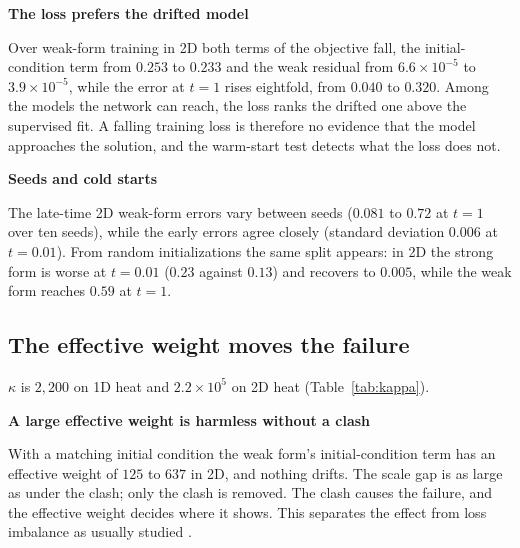 \documentclass[a4paper,fleqn]{cas-sc}
\newcommand{\runhead}[1]{\par\medskip\noindent\textbf{#1}\par\nopagebreak\noindent\ignorespaces}
\begin{document}
\runhead{The loss prefers the drifted model}
Over weak-form training in 2D both terms of the objective fall, the
initial-condition term from $0.253$ to $0.233$ and the weak residual from $6.6\times10^{-5}$ to $3.9\times10^{-5}$, while
the error at $t=1$ rises eightfold, from $0.040$ to $0.320$. Among the models the network can reach, the loss ranks the
drifted one above the supervised fit. A falling training loss is therefore no evidence that the model approaches the
solution, and the warm-start test detects what the loss does not.

\runhead{Seeds and cold starts}
The late-time 2D weak-form errors vary between seeds ($0.081$ to $0.72$ at $t=1$ over ten
seeds), while the early errors agree closely (standard deviation $0.006$ at $t=0.01$). From random initializations the
same split appears: in 2D the strong form is worse at $t=0.01$ ($0.23$ against $0.13$) and recovers to $0.005$, while the
weak form reaches $0.59$ at $t=1$.

\subsection{The effective weight moves the failure}
\label{sec:sweeps}

$\kappa$ is $2{,}200$ on 1D heat and $2.2\times10^5$ on 2D heat (Table~\ref{tab:kappa}).

\runhead{A large effective weight is harmless without a clash}
With a matching initial condition the weak form's
initial-condition term has an effective weight of $125$ to $637$ in 2D, and nothing drifts. The scale gap is as large as
under the clash; only the clash is removed. The clash causes the failure, and the effective weight decides where it
shows. This separates the effect from loss imbalance as usually studied \cite{wang2021gradientflow,wang2022ntk}.
\end{document}
